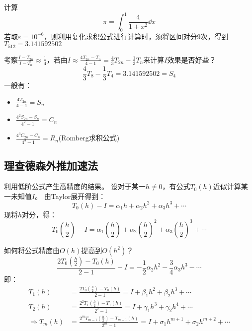 \begin{example}
    计算
    \begin{equation*}
    \pi = \int_{0}^{1}\frac{4}{1+x^2}\dd{x}    
    \end{equation*}
    若取$\varepsilon = 10^{-6}$，则利用复化求积公式进行计算时，须将区间对分9次，得到$T_{512} = 3.141592502$
\end{example}

考察$\frac{I-T_{2n}}{I-T_n} \approx \frac{1}{4}$，若由$I \approx \frac{4T_{2n}-T_n}{4-1} = \frac{4}{3}T_{2n}-\frac{1}{3}T_n$来计算$I$效果是否好些？
\begin{equation*}
    \frac{4}{3}T_8-\frac{1}{3}T_4 = 3.141592502 = S_4
\end{equation*}
一般有：
\begin{itemize}
    \item $\frac{4T_{2n}}{4-1} = S_n$
    \item $\frac{4^2S_{2n}-S_n}{4^2-1} = C_n$
    \item $\frac{4^3C_{2n}-C_n}{4^3-1} = R_n$(Romberg求积公式)
\end{itemize}

\subsection{理查德森外推加速法}

利用低阶公式产生高精度的结果。
设对于某一$h \neq 0$，有公式$T_0(h)$近似计算某一未知值$I$。
由Taylor展开得到：
\begin{equation*}
    T_0(h)-I = \alpha_1h+\alpha_2h^2+\alpha_3h^3+\cdots
\end{equation*}
现将$h$对分，得：
\begin{equation*}
    T_0(\frac{h}{2})-I = \alpha_1(\frac{h}{2})+\alpha_2(\frac{h}{2})^2+\alpha_3(\frac{h}{2})^3+\cdots
\end{equation*}

如何将公式精度由$O(h)$提高到$O(h^2)$？
\begin{equation*}
    \frac{2T_0(\frac{h}{2})-T_0(h)}{2-1}-I = -\frac{1}{2}\alpha_2h^2-\frac{3}{4}\alpha_3h^3-\cdots
\end{equation*}
即：
\begin{align*}
    T_1(h) &= \frac{2T_0(\frac{h}{2})-T_0(h)}{2-1} = I+\beta_1h^2+\beta_2h^3+\cdots\\
    T_2(h) &= \frac{2^2T_1(\frac{h}{2})-T_1(h)}{2^2-1} = I+\gamma_1h^3+\gamma_2h^4+\cdots\\
    \Rightarrow T_m(h) &= \frac{2^mT_{m-1}(\frac{h}{2})-T_{m-1}(h)}{2^m-1} = I+\sigma_1h^{m+1}+\sigma_2h^{m+2}+\cdots
\end{align*}


